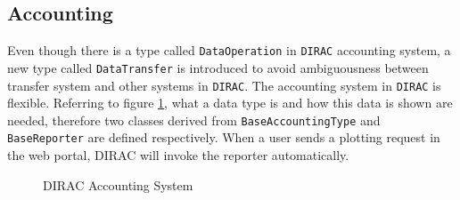 \subsection{Accounting}

Even though there is a type called {\tt DataOperation} in {\tt DIRAC}
accounting system, a new type called {\tt DataTransfer}
is introduced to avoid ambiguousness between transfer system
and other systems in {\tt DIRAC}.
The accounting system 
in {\tt DIRAC} is flexible. Referring to figure \ref{fig:acct},
what a data type is and how this data is shown
are needed,
therefore two classes derived from {\tt BaseAccountingType}
and {\tt BaseReporter} are defined respectively.
When a user sends a plotting request in the web portal, 
DIRAC will invoke the reporter automatically.
\begin{figure}[htbp]
    
    \caption{\label{fig:acct}DIRAC Accounting System}
\end{figure}
